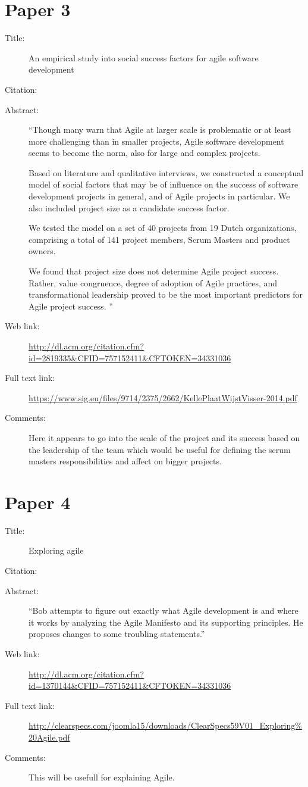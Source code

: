 \documentclass{scrartcl}
\begin{document}
\section*{Paper 3}
\begin{description}
	\item[Title:] An empirical study into social success factors for agile software development
	\item[Citation:] \cite{SocialAgile}
	\item[Abstract:] ``Though many warn that Agile at larger scale is problematic or at least more challenging than in smaller projects, Agile software development seems to become the norm, also for large and complex projects.
	
	Based on literature and qualitative interviews, we constructed a conceptual model of social factors that may be of influence on the success of software development projects in general, and of Agile projects in particular. We also included project size as a candidate success factor.
	
	We tested the model on a set of 40 projects from 19 Dutch organizations, comprising a total of 141 project members, Scrum Masters and product owners.
	
	We found that project size does not determine Agile project success. Rather, value congruence, degree of adoption of Agile practices, and transformational leadership proved to be the most important predictors for Agile project success.
	''
	\item[Web link:] \url{http://dl.acm.org/citation.cfm?id=2819335&CFID=757152411&CFTOKEN=34331036}
	\item[Full text link:] \url{https://www.sig.eu/files/9714/2375/2662/KellePlaatWijstVisser-2014.pdf}
	\item[Comments:] Here it appears to go into the scale of the project and its success based on the leadership of the team which would be useful for defining the scrum masters responsibilities and affect on bigger projects.
\end{description}

\section*{Paper 4}
\begin{description}
	\item[Title:] Exploring agile
	\item[Citation:] \cite{Agile}
	\item[Abstract:] ``Bob attempts to figure out exactly what Agile development is and where it works by analyzing the Agile Manifesto and its supporting principles. He proposes changes to some troubling statements.''
	\item[Web link:] \url{http://dl.acm.org/citation.cfm?id=1370144&CFID=757152411&CFTOKEN=34331036}
	\item[Full text link:] \url{http://clearspecs.com/joomla15/downloads/ClearSpecs59V01_Exploring%20Agile.pdf}
	\item[Comments:] This will be usefull for explaining Agile.
\end{description}
\end{document}
